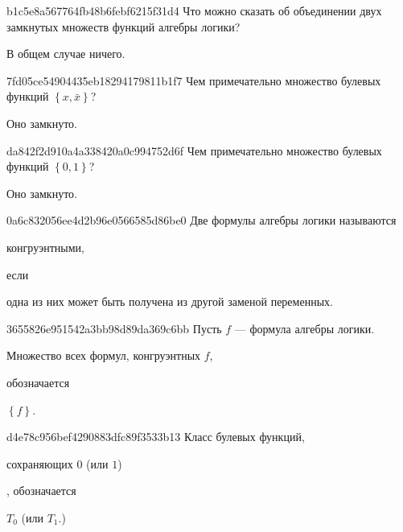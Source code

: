 \begin{note}{b1c5e8a567764fb48b6febf6215f31d4}
    Что можно сказать об объединении двух замкнутых множеств функций алгебры логики?

    \begin{cloze}{1}
        В общем случае ничего.
    \end{cloze}
\end{note}

\begin{note}{7fd05ce54904435eb18294179811b1f7}
    Чем примечательно множество булевых функций \({ \left\{ x, \bar x \right\} }\)?

    \begin{cloze}{1}
        Оно замкнуто.
    \end{cloze}
\end{note}

\begin{note}{da842f2d910a4a338420a0c994752d6f}
    Чем примечательно множество булевых функций \({ \left\{ 0, 1 \right\} }\)?

    \begin{cloze}{1}
        Оно замкнуто.
    \end{cloze}
\end{note}

\begin{note}{0a6c832056ee4d2b96e0566585d86be0}
    Две формулы алгебры логики называются \begin{icloze}{2}конгруэнтными,\end{icloze} если \begin{icloze}{1}одна из них может быть получена из другой заменой переменных.\end{icloze}
\end{note}

\begin{note}{3655826e951542a3bb98d89da369c6bb}
    Пусть \({ f }\) --- формула алгебры логики.
    \begin{icloze}{2}Множество всех формул, конгруэнтных \({ f }\),\end{icloze} обозначается \begin{icloze}{1}\({ \left\{ f \right\} }\).\end{icloze}
\end{note}

\begin{note}{d4e78c956bef4290883dfc89f3533b13}
    Класс булевых функций, \begin{icloze}{2}сохраняющих \({ 0 }\) (или \({ 1 }\))\end{icloze}, обозначается \begin{icloze}{1}\({ T_0 }\) (или \({ T_1 }\).)\end{icloze}
\end{note}

